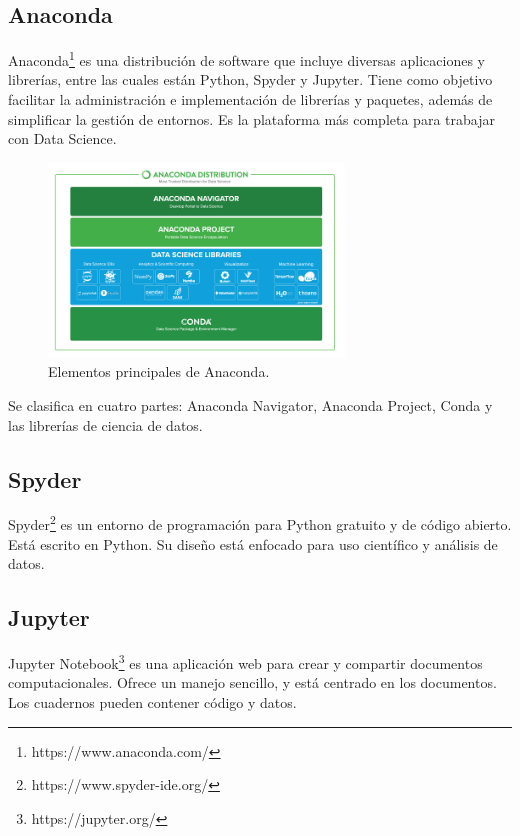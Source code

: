 \documentclass[../main.tex]{subfiles}
\begin{document}
\renewcommand{\thefootnote}{\roman{footnote}}

\subsection{Anaconda}

Anaconda\footnote{https://www.anaconda.com/} es una distribución de software que incluye diversas aplicaciones y librerías, entre las cuales están Python, Spyder y Jupyter. Tiene como objetivo facilitar la administración e implementación de librerías y paquetes, además de simplificar la gestión de entornos. Es la plataforma más completa para trabajar con Data Science.

\begin{figure}[h]
	\centering
	\includegraphics[width=0.7\textwidth]{../images/anaconda-distribution.png}
	\caption{Elementos principales de Anaconda. \cite{anaconda2017figure}}
\end{figure}

Se clasifica en cuatro partes: Anaconda Navigator, Anaconda Project, Conda y las librerías de ciencia de datos.

\subsection{Spyder}
Spyder\footnote{https://www.spyder-ide.org/} es un entorno de programación para Python gratuito y de código abierto. Está escrito en Python. Su diseño está enfocado para uso científico y análisis de datos.

\subsection{Jupyter}

Jupyter Notebook\footnote{https://jupyter.org/} es una aplicación web para crear y compartir documentos computacionales. Ofrece un manejo sencillo, y está centrado en los documentos. Los cuadernos pueden contener código y datos.
\end{document}
